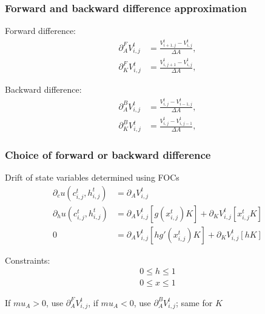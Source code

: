 \documentclass[aspectratio=169]{beamer}
\newenvironment{wideitemize}{\itemize\addtolength{\itemsep}{10pt}}{\enditemize}
\begin{document}
\begin{frame}
    \frametitle{Forward and backward difference approximation}

    \begin{wideitemize}
        \item Forward difference:
        \begin{align*}
            \partial_A^F V_{i,j}^t &= \frac{V_{i+1, j}^t - V_{i, j}^t}{\Delta A}, \\
            \partial_K^F V_{i,j}^t &= \frac{V_{i, j+1}^t - V_{i, j}^t}{\Delta A},
        \end{align*}
        \item Backward difference:
        \begin{align*}
            \partial_A^B V_{i,j}^t &= \frac{V_{i, j}^t - V_{i-1, j}^t}{\Delta A}, \\
            \partial_K^B V_{i,j}^t &= \frac{V_{i, j}^t - V_{i, j-1}^t}{\Delta A},
        \end{align*}
    \end{wideitemize}

\end{frame}

\begin{frame}
    \frametitle{Choice of forward or backward difference}

    \begin{wideitemize}
        \item Drift of state variables determined using FOCs
        \begin{align}
            \partial_c u(c_{i,j}^t, h_{i,j}^t) &= \partial_A V_{i,j}^t \\
            \partial_h u(c_{i,j}^t, h_{i,j}^t) &= \partial_A V_{i,j}^t \left[ g(x_{i, j}^t) K \right] + \partial_K V_{i,j}^t \left[ x_{i, j}^t K \right] \\
            0 &= \partial_A V_{i,j}^t \left[ h g'(x_{i, j}^t) K \right] + \partial_K V_{i,j}^t \left[ h K \right]
        \end{align}
        \item Constraints:
        \begin{align}
            0 \leq h \leq 1 \\
            0 \leq x \leq 1
        \end{align}
        \item If $mu_A > 0$, use $\partial_A^F V_{i,j}^t$, if $mu_A < 0$, use $\partial_A^B V_{i,j}^t$; same for $K$
    \end{wideitemize}

\end{frame}
\end{document}
